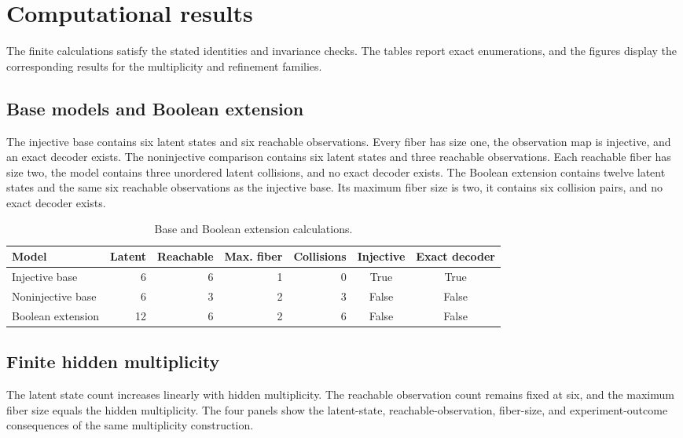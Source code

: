 \section{Computational results}
\label{sec:results}

The finite calculations satisfy the stated identities and invariance checks. The tables report exact enumerations, and the figures display the corresponding results for the multiplicity and refinement families.

\subsection{Base models and Boolean extension}

The injective base contains six latent states and six reachable observations. Every fiber has size one, the observation map is injective, and an exact decoder exists. The noninjective comparison contains six latent states and three reachable observations. Each reachable fiber has size two, the model contains three unordered latent collisions, and no exact decoder exists. The Boolean extension contains twelve latent states and the same six reachable observations as the injective base. Its maximum fiber size is two, it contains six collision pairs, and no exact decoder exists.

\begin{table}[tbp]
\centering
\caption{Base and Boolean extension calculations.}
\label{tab:baseboolean}
\small
\begin{tabular}{@{}lrrrrcc@{}}
\toprule
Model & Latent & Reachable & Max. fiber & Collisions & Injective & Exact decoder \\
\midrule
Injective base & 6 & 6 & 1 & 0 & True & True \\
Noninjective base & 6 & 3 & 2 & 3 & False & False \\
Boolean extension & 12 & 6 & 2 & 6 & False & False \\
\bottomrule
\end{tabular}
\end{table}

\subsection{Finite hidden multiplicity}

The latent state count increases linearly with hidden multiplicity. The reachable observation count remains fixed at six, and the maximum fiber size equals the hidden multiplicity. The four panels show the latent-state, reachable-observation, fiber-size, and experiment-outcome consequences of the same multiplicity construction.

